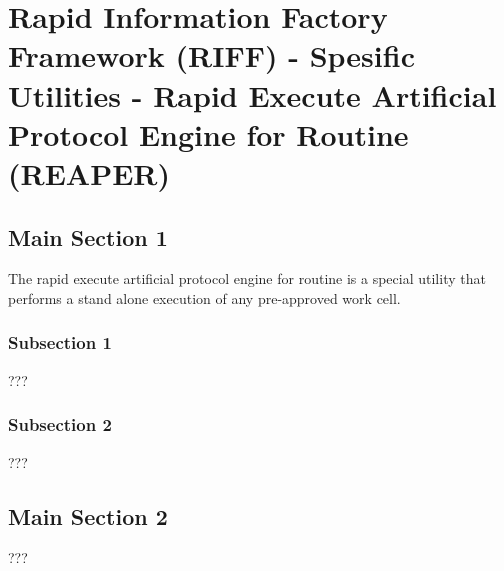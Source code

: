 
\chapter{Rapid Information Factory Framework (RIFF) - Spesific Utilities - Rapid Execute Artificial Protocol Engine for Routine (REAPER)} %

\label{Chapter43} %



\section{Main Section 1}

The rapid execute artificial protocol engine for routine is a special utility that performs a stand alone execution of any pre-approved work cell.

\subsection{Subsection 1}

???


\subsection{Subsection 2}

???


\section{Main Section 2}

???
